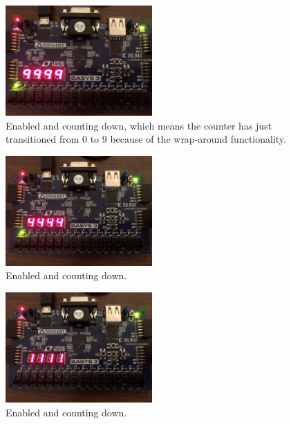 \documentclass[11pt]{article}
\begin{document}
\begin{figure}[H]
\begin{center}
	\includegraphics[width=0.5\textwidth]{./images/p2/IMG_1010.jpg}
	\caption{\label{fig:advanced_counter_res4}Enabled and counting down, which means the counter has just transitioned from 0 to 9 because of the wrap-around functionality.}
\end{center}
\end{figure}

\begin{figure}[H]
\begin{center}
	\includegraphics[width=0.5\textwidth]{./images/p2/IMG_1011.jpg}
	\caption{\label{fig:advanced_counter_res5}Enabled and counting down.}
\end{center}
\end{figure}

\begin{figure}[H]
\begin{center}
	\includegraphics[width=0.5\textwidth]{./images/p2/IMG_1012.jpg}
	\caption{\label{fig:advanced_counter_res6}Enabled and counting down.}
\end{center}
\end{figure}
\end{document}

